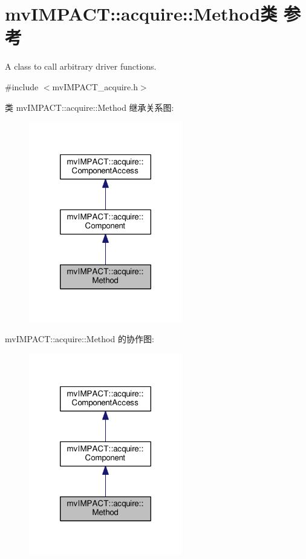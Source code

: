 \hypertarget{classmv_i_m_p_a_c_t_1_1acquire_1_1_method}{\section{mv\+I\+M\+P\+A\+C\+T\+:\+:acquire\+:\+:Method类 参考}
\label{classmv_i_m_p_a_c_t_1_1acquire_1_1_method}
}


A class to call arbitrary driver functions.  




{\ttfamily \#include $<$mv\+I\+M\+P\+A\+C\+T\+\_\+acquire.\+h$>$}



类 mv\+I\+M\+P\+A\+C\+T\+:\+:acquire\+:\+:Method 继承关系图\+:
\nopagebreak
\begin{figure}[H]
\begin{center}
\leavevmode
\includegraphics[width=190pt]{classmv_i_m_p_a_c_t_1_1acquire_1_1_method__inherit__graph}
\end{center}
\end{figure}


mv\+I\+M\+P\+A\+C\+T\+:\+:acquire\+:\+:Method 的协作图\+:
\nopagebreak
\begin{figure}[H]
\begin{center}
\leavevmode
\includegraphics[width=190pt]{classmv_i_m_p_a_c_t_1_1acquire_1_1_method__coll__graph}
\end{center}
\end{figure}
